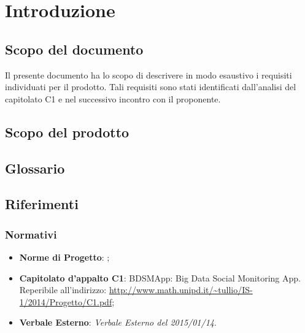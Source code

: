 %


\section{Introduzione}

\subsection{Scopo del documento}
Il presente documento ha lo scopo di descrivere in modo esaustivo i requisiti individuati per il prodotto. Tali requisiti sono stati identificati dall'analisi del capitolato C1 e nel successivo incontro con il proponente.

\subsection{Scopo del prodotto}
	\productScope

\subsection{Glossario}
	\glossarioDesc

\subsection{Riferimenti}
	\subsubsection{Normativi}
		\begin{itemize}
			\item \textbf{Norme di Progetto}: \docNameVersionNdP;
			\item \textbf{Capitolato d’appalto C1}: BDSMApp: Big Data Social Monitoring App. Reperibile all’indirizzo: \url{http://www.math.unipd.it/~tullio/IS-1/2014/Progetto/C1.pdf};
			\item \textbf{Verbale Esterno}: \emph{Verbale Esterno del 2015/01/14}.
		\end{itemize}

